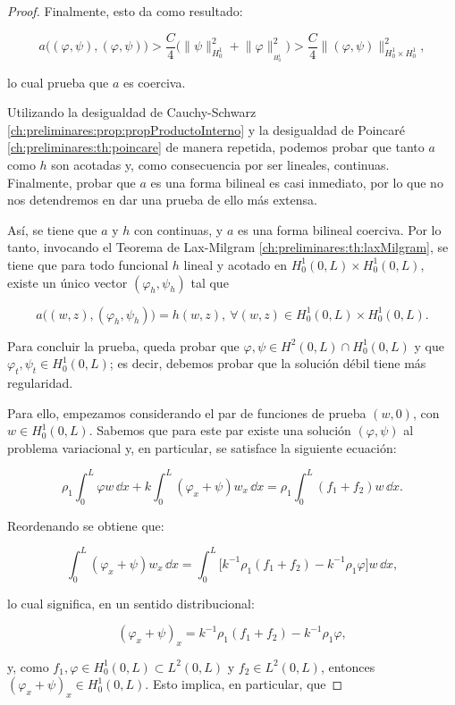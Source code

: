 \begin{proof}
    Finalmente, esto da como resultado:

    \[a\big((\varphi, \psi), (\varphi, \psi)\big) >\frac{C}{4}\big( \lVert \psi \rVert^2_{H^1_0} + \lVert \varphi \rVert^2_{_{H^1_0}} \big) > \frac{C}{4}\lVert (\varphi, \psi) \rVert^2_{H_0^1 \times H_0^1},\]

    lo cual prueba que $a$ es coerciva.

    Utilizando la desigualdad de Cauchy-Schwarz \ref{ch:preliminares:prop:propProductoInterno} y la desigualdad de Poincaré \ref{ch:preliminares:th:poincare} de manera repetida, podemos probar que tanto $a$ como $h$ son acotadas y, como consecuencia por ser lineales, continuas. Finalmente, probar que $a$ es una forma bilineal es casi inmediato, por lo que no nos detendremos en dar una prueba de ello más extensa.

    Así, se tiene que $a$ y $h$ con continuas, y $a$ es una forma bilineal coerciva. Por lo tanto, invocando el Teorema de Lax-Milgram \ref{ch:preliminares:th:laxMilgram}, se tiene que para todo funcional $h$ lineal y acotado en $H_0^1(0,L) \times H_0^1(0,L)$, existe un único vector $(\varphi_h, \psi_h)$ tal que

    \[a\big((w, z), (\varphi_h, \psi_h)\big) = h(w,z), \ \forall (w,z) \in H_0^1(0,L) \times H_0^1(0,L).\]

    Para concluir la prueba, queda probar que $\varphi, \psi \in H^2(0,L) \cap H^1_0(0,L)$ y que $\varphi_t, \psi_t \in H^1_0(0,L)$; es decir, debemos probar que la solución débil tiene más regularidad. 
    
    Para ello, empezamos considerando el par de funciones de prueba $(w,0)$, con $w \in H_0^1(0,L)$. Sabemos que para este par existe una solución $(\varphi, \psi)$ al problema variacional y, en particular, se satisface la siguiente ecuación:

    \[\rho_1 \int_0^L \varphi w \, \dd x + k \int_0^L(\varphi_x + \psi) w_x \, \dd x = \displaystyle\rho_1 \int_0^L (f_1 + f_2) w \, \dd x.\]    

    Reordenando se obtiene que:

    \[\int_0^L(\varphi_x + \psi) w_x \, \dd x = \int_0^L \big[k^{-1}\rho_1(f_1 + f_2) - k^{-1}\rho_1\varphi \big]w \, \dd x,\]

    lo cual significa, en un sentido distribucional:

    \[(\varphi_x + \psi)_x = k^{-1}\rho_1(f_1 + f_2) - k^{-1}\rho_1\varphi,\]

    y, como $f_1, \varphi \in H_0^1(0,L) \subset L^2(0,L)$ y $f_2 \in L^2(0,L)$, entonces $(\varphi_x + \psi)_x \in H_0^1(0,L)$. Esto implica, en particular, que


\end{proof}
